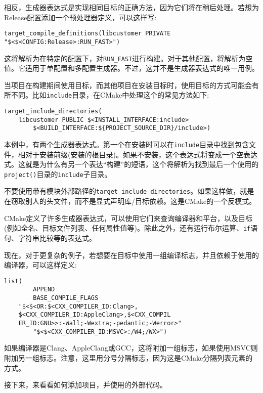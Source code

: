 相反，生成器表达式是实现相同目标的正确方法，因为它们将在稍后处理。若想为Release配置添加一个预处理器定义，可以这样写:

\begin{lstlisting}[style=styleCMake]
target_compile_definitions(libcustomer PRIVATE
"$<$<CONFIG:Release>:RUN_FAST>")
\end{lstlisting}

这将解析为在特定的配置下，对\texttt{RUN\_FAST}进行构建。对于其他配置，将解析为空值。它适用于单配置和多配置生成器。不过，这并不是生成器表达式的唯一用例。

当项目在构建期间使用目标，而其他项目在安装目标时，使用目标的方式可能会有所不同。比如\texttt{include}目录，在CMake中处理这个的常见方法如下:

\begin{lstlisting}[style=styleCMake]
target_include_directories(
	libcustomer PUBLIC $<INSTALL_INTERFACE:include>
		$<BUILD_INTERFACE:${PROJECT_SOURCE_DIR}/include>)
\end{lstlisting}

本例中，有两个生成器表达式。第一个在安装时可以在\texttt{include}目录中找到包含文件，相对于安装前缀(安装的根目录)。如果不安装，这个表达式将变成一个空表达式。这就是为什么有另一个表达“构建”的短语，这个将解析为找到最后一个使用的\texttt{project()}目录的\texttt{include}子目录。

\begin{tcolorbox}[colback=blue!5!white,colframe=blue!75!black, title=Note]
\hspace*{0.7cm}不要使用带有模块外部路径的\texttt{target\_include\_directories}。如果这样做，就是在窃取别人的头文件，而不是显式声明库/目标依赖。这是CMake的一个反模式。
\end{tcolorbox}

CMake定义了许多生成器表达式，可以使用它们来查询编译器和平台，以及目标(例如全名、目标文件列表、任何属性值等)。除此之外，还有运行布尔运算、\texttt{if}语句、字符串比较等的表达式。

现在，对于更复杂的例子，若想要在目标中使用一组编译标志，并且依赖于使用的编译器，可以这样定义:

\begin{lstlisting}[style=styleCMake]
list(
		APPEND
		BASE_COMPILE_FLAGS
	"$<$<OR:$<CXX_COMPILER_ID:Clang>,
	$<CXX_COMPILER_ID:AppleClang>,$<CXX_COMPIL
	ER_ID:GNU>>:-Wall;-Wextra;-pedantic;-Werror>"
		"$<$<CXX_COMPILER_ID:MSVC>:/W4;/WX>")
\end{lstlisting}

如果编译器是Clang、AppleClang或GCC，这将附加一组标志，如果使用MSVC则附加另一组标志。注意，这里用分号分隔标志，因为这是CMake分隔列表元素的方式。

接下来，来看看如何添加项目，并使用的外部代码。








